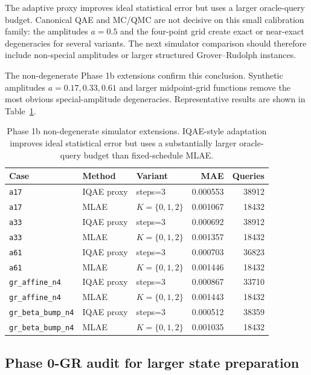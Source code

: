 The adaptive proxy improves ideal statistical error but uses a larger
oracle-query budget. Canonical QAE and MC/QMC are not decisive on this small
calibration family: the amplitudes \(a=0.5\) and the four-point grid create
exact or near-exact degeneracies for several variants. The next simulator
comparison should therefore include non-special amplitudes or larger structured
Grover--Rudolph instances.

The non-degenerate Phase 1b extensions confirm this conclusion. Synthetic
amplitudes \(a=0.17,0.33,0.61\) and larger midpoint-grid functions remove the
most obvious special-amplitude degeneracies. Representative results are shown in
Table~\ref{tab:phase1b-nondegenerate}.

\begin{table}[h]
\centering
\begin{tabular}{lllrr}
\toprule
Case & Method & Variant & MAE & Queries \\
\midrule
\texttt{a17} & IQAE proxy & steps=3 & 0.000553 & 38912 \\
\texttt{a17} & MLAE & \(K=\{0,1,2\}\) & 0.001067 & 18432 \\
\texttt{a33} & IQAE proxy & steps=3 & 0.000692 & 38912 \\
\texttt{a33} & MLAE & \(K=\{0,1,2\}\) & 0.001357 & 18432 \\
\texttt{a61} & IQAE proxy & steps=3 & 0.000703 & 36823 \\
\texttt{a61} & MLAE & \(K=\{0,1,2\}\) & 0.001446 & 18432 \\
\texttt{gr\_affine\_n4} & IQAE proxy & steps=3 & 0.000867 & 33710 \\
\texttt{gr\_affine\_n4} & MLAE & \(K=\{0,1,2\}\) & 0.001443 & 18432 \\
\texttt{gr\_beta\_bump\_n4} & IQAE proxy & steps=3 & 0.000512 & 38359 \\
\texttt{gr\_beta\_bump\_n4} & MLAE & \(K=\{0,1,2\}\) & 0.001035 & 18432 \\
\bottomrule
\end{tabular}
\caption{Phase 1b non-degenerate simulator extensions. IQAE-style adaptation
improves ideal statistical error but uses a substantially larger oracle-query
budget than fixed-schedule MLAE.}
\label{tab:phase1b-nondegenerate}
\end{table}

\subsection{Phase 0-GR audit for larger state preparation}

